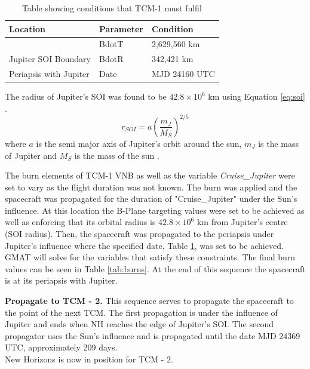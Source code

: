 \documentclass[11pt]{article}
\begin{document}
\begin{table}[H]
\centering
\caption{Table showing conditions that TCM-1 must fulfil}
\begin{tabular}{lll}
\hline
\rowcolor[HTML]{CBCEFB} 
Location                         & Parameter & Condition     \\ \hline
                              & BdotT     & 2,629,560 km  \\
\multirow{-2}{*}{Jupiter SOI Boundary} & BdotR     & 342,421 km    \\\hline
Periapsis with Jupiter                     & Date      & MJD 24160 UTC \\ \hline
\end{tabular}
\label{tab:tcm1}
\end{table}
The radius of Jupiter's SOI was found to be $42.8\times10^6$ km using Equation \ref{eq:soi} .
\begin{equation}
    r_{SOI}=a\left(\frac{m_J}{M_S}\right)^{2/5} \label{eq:soi}
\end{equation}{}
where $a$ is the semi major axis of Jupiter's orbit around the sun, $m_J$ is the mass of Jupiter and $M_S$ is the mass of the sun \cite{soi}.

The burn elements of TCM-1 VNB as well as the variable \textit{Cruise\_Jupiter} were set to vary as the flight duration was not known. The burn was applied and the spacecraft was propagated for the duration of "Cruise\_Jupiter" under the Sun's influence. At this location the B-Plane targeting values were set to be achieved as well as enforcing that its orbital radius is $42.8\times10^6$ km from Jupiter's centre (SOI radius). Then, the spacecraft was propagated to the periapsis under Jupiter's influence where the specified date, Table \ref{tab:tcm1}, was set to be achieved.
GMAT will solve for the variables that satisfy these constraints. The final burn values can be seen in Table \ref{tab:burns}. At the end of this sequence the spacecraft is at its periapsis with Jupiter.

\textbf{Propagate to TCM - 2.} This sequence serves to propagate the spacecraft to the point of the next TCM. The first propagation is under the influence of Jupiter and ends when NH reaches the edge of Jupiter's SOI. The second propagator uses the Sun's influence and is propagated until the date MJD 24369 UTC, approximately 209 days.\\ New Horizons is now in position for TCM - 2.
\end{document}
